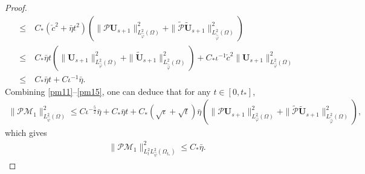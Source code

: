 \documentclass{amsart}
\numberwithin{equation}{section}
\begin{document}
\begin{proof}
\begin{align}
\leq&~C_{*}(\check{c}^{2}+\bar{\eta}t^{2})\left(\|\mathcal{P}\mathbf{U}_{s+1}\|_{L_{\hat{\varphi}}^{2}(\Omega)}^{2}+\|\tilde{\mathcal{P}}\tilde{\mathbf{U}}_{s+1}\|_{L_{\tilde{\hat{\varphi}}}^{2}(\Omega)}^{2}\right)\nonumber\\
\leq&~C_{*}\bar{\eta}t\left(\|\mathbf{U}_{s+1}\|_{L_{\hat{\varphi}}^{2}(\Omega)}^{2}+\|\tilde{\mathbf{U}}_{s+1}\|_{L_{\tilde{\hat{\varphi}}}^{2}(\Omega)}^{2}\right)
     +C_{*}\iota^{-1}\check{c}^{2}\|\mathbf{U}_{s+1}\|_{L_{\hat{\varphi}}^{2}(\Omega)}^{2}\nonumber\\
\leq&~C_{*}\bar{\eta}t+C\iota^{-1}\bar{\eta}.\nonumber
\end{align}
Combining \eqref{pm11}--\eqref{pm15}, one can deduce that for any $t\in[0,t_{*}]$,
\begin{align*}
\|\mathcal{P}\mathcal{M}_{1}\|_{L_{\hat{\psi}}^{2}(\Omega)}^{2}
\leq  C\iota^{-\frac{5}{2}}\bar{\eta}+C_{*}\bar{\eta}t
     +C_{*}(\sqrt{\iota}+\sqrt{t})\bar{\eta}(\|\mathcal{P}\mathbf{U}_{s+1}\|_{L_{\hat{\varphi}}^{2}(\Omega)}^{2}
            +\|\tilde{\mathcal{P}}\tilde{\mathbf{U}}_{s+1}\|_{L_{\tilde{\hat{\varphi}}}^{2}(\Omega)}^{2}),
\end{align*}
which gives
\begin{align}\label{pm1}
\|\mathcal{P}\mathcal{M}_{1}\|_{L_{t}^{2}L_{\hat{\psi}}^{2}(\Omega_{t_{*}})}^{2}\leq C_{*}\bar{\eta}.
\end{align}


\end{proof}
\end{document}
